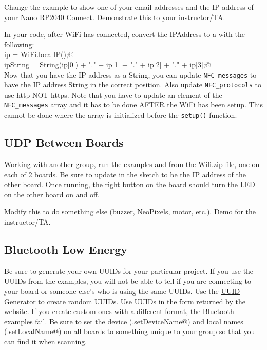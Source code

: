 Change the example to show one of your email addresses and the IP address of your 
Nano RP2040 Connect. Demonstrate this to your instructor/TA.

In your code, after WiFi has connected, convert the IPAddress to a \lstinline@String@ 
with the following:\\
\lstinline@IPAddress ip = WiFi.localIP();@\\
\lstinline@String ipString = String(ip[0]) + "." + ip[1] + "." + ip[2] + "." + ip[3];@\\
Now that you have the IP address as a String, you can update \lstinline|NFC_messages| to 
have the IP address String in the correct position. Also update \lstinline|NFC_protocols| 
to use http NOT https. Note that you have to update an element of the \lstinline|NFC_messages| 
array and it has to be done AFTER the WiFi has been setup. This cannot be done where the array is 
initialized before the \lstinline|setup()| function. 


\subsection{UDP Between Boards}
Working with another group, run the examples \lstinline@WiFiUdpSend@ and 
\lstinline@WiFiUdpReceiveSend@ from the Wifi.zip file, one on each of 2 boards. 
Be sure to update \lstinline@remoteIp@ in the 
\lstinline@WiFiUdpSend@ sketch to be the IP address of the other board. Once 
running, the right button on the \lstinline@@ board should turn the LED on 
the other board on and off.

Modify this to do something else (buzzer, NeoPixels, motor, etc.). Demo for the 
instructor/TA.

\subsection{Bluetooth Low Energy}
Be sure to generate your own UUIDs for your particular project. If you use
the UUIDs from the examples, you will not be able to tell if you are connecting
to your board or someone else's who is using the same UUIDs. Use the 
\href{https://www.uuidgenerator.net/}{UUID Generator} to create random UUIDs.
Use UUIDs in the form returned by the website. If you create custom ones with 
a different format, the Bluetooth examples fail.
Be sure to set the device (\lstinline@BLE.setDeviceName@) and local names 
(\lstinline@BLE.setLocalName@) on all boards to something unique to 
your group so that you can find it when scanning.

